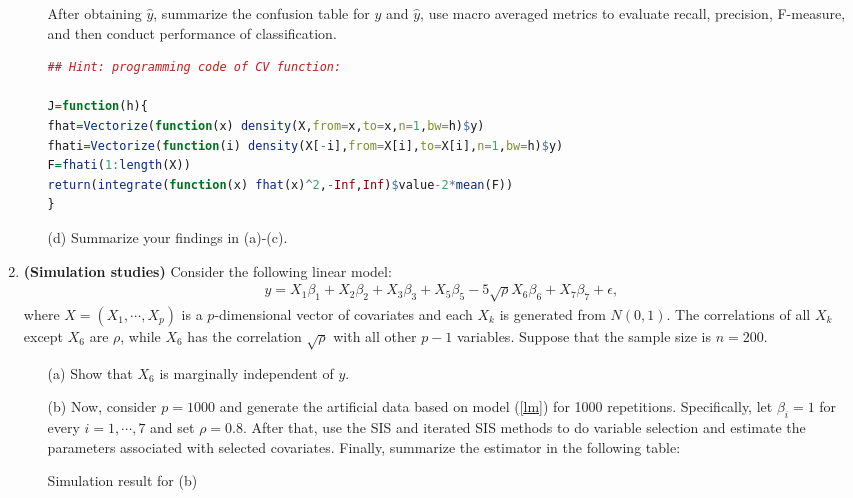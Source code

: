 \documentclass[11pt]{article}
\begin{document}
\begin{enumerate}
\begin{itemize}
After obtaining $\widehat{y}$, summarize the confusion table for $y$ and $\widehat{y}$, use macro averaged metrics to evaluate recall, precision, F-measure, and then conduct performance of classification. 

\begin{lstlisting}[language=R]
## Hint: programming code of CV function:

J=function(h){
fhat=Vectorize(function(x) density(X,from=x,to=x,n=1,bw=h)$y)
fhati=Vectorize(function(i) density(X[-i],from=X[i],to=X[i],n=1,bw=h)$y)
F=fhati(1:length(X))
return(integrate(function(x) fhat(x)^2,-Inf,Inf)$value-2*mean(F))
}

\end{lstlisting}

\item[(d)] Summarize your findings in (a)-(c).

\end{itemize}



\clearpage

\item {\bf (Simulation studies)} Consider the following linear model:
\begin{eqnarray} \label{lm}
y = X_1 \beta_1 + X_2 \beta_2 + X_3 \beta_3 + X_5 \beta_5 - 5\sqrt{\rho} X_6 \beta_6 + X_7 \beta_7 + \epsilon,
\end{eqnarray}
where $X = \left( X_1,\cdots,X_p \right)$ is a $p$-dimensional vector of covariates and each $X_k$ is generated from $N(0,1)$. The correlations of all $X_k$ except $X_6$ are $\rho$, while $X_6$ has the correlation $\sqrt{\rho}$ with all other $p-1$ variables. Suppose that the sample size is $n=200$.

\begin{itemize}

\item[(a)] Show that $X_6$ is marginally independent of $y$.


\item[(b)] Now, consider $p=1000$ and generate the artificial data based on model (\ref{lm}) for 1000 repetitions. Specifically, let $\beta_i=1$ for every $i=1,\cdots,7$ and set $\rho=0.8$. After that, use the SIS and iterated SIS methods to do variable selection and estimate the parameters associated with selected covariates. Finally, summarize the estimator in the following table:

\begin{table}[!ht]
       \huge
     \caption{Simulation result for (b)}


\end{table}
\end{itemize}
\end{enumerate}
\end{document}
